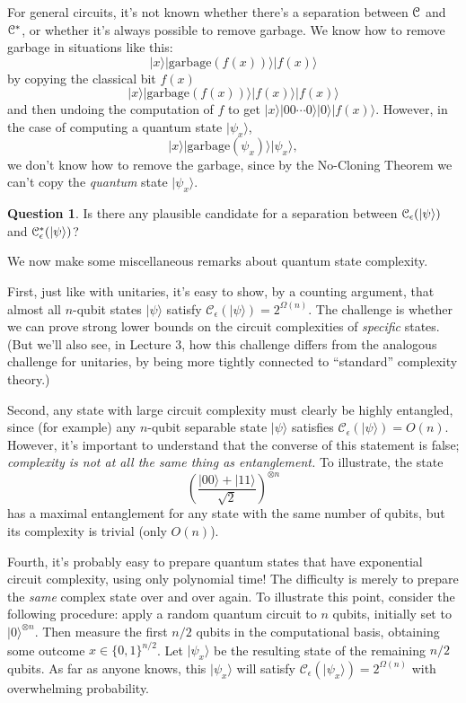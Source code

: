\documentclass[11pt]{report}
\theoremstyle{plain}
\theoremstyle{definition}
\newtheorem{question}[theorem]{Question}
\renewcommand{\ket}[1]{|#1\rangle}
\begin{document}
For general circuits, it's not known whether there's a separation between $\cal C$ and $\cal C^*$, or whether it's always possible to remove garbage.  We know how to remove garbage in situations like this:
\[
 \ket{x}\ket{\mathrm{garbage}(f(x))}\ket{f(x)}
\]
by copying the classical bit $f(x)$
\[
 \ket{x}\ket{\mathrm{garbage}(f(x))}\ket{f(x)}\ket{f(x)}
\]
and then undoing the computation of $f$ to get $\ket{x}\ket{00 \cdots 0}\ket{0}\ket{f(x)}$.
However, in the case of computing a quantum state $\ket{\psi_x}$,
\[
 \ket{x}\ket{\mathrm{garbage}(\psi_x)}\ket{\psi_x},
\]
we don't know how to remove the garbage, since by the No-Cloning Theorem we can't copy the {\em quantum} state $\ket{\psi_x}$.

\begin{question}
Is there any plausible candidate for a separation between $\cal C_{\epsilon}(\ket{\psi})$ and $\cal C^*_{\epsilon}(\ket{\psi})$?
\end{question}

We now make some miscellaneous remarks about quantum state complexity.

First, just like with unitaries, it's easy to show, by a counting argument, that almost all $n$-qubit states $\ket{\psi}$ satisfy $\mathcal{C}_{\epsilon}(\ket{\psi}) = 2^{\Omega(n)}$.  The challenge is whether we can prove strong lower bounds on the circuit complexities of {\em specific} states.  (But we'll also see, in Lecture 3, how this challenge differs from the analogous challenge for unitaries, by being more tightly connected to ``standard'' complexity theory.)

Second, any state with large circuit complexity must clearly be highly entangled, since (for example) any $n$-qubit separable state $\ket{\psi}$ satisfies $\mathcal{C}_{\epsilon}(\ket{\psi}) = O(n)$.  However, it's important to understand that the converse of this statement is false; {\em complexity is not at all the same thing as entanglement.}  To illustrate, the state
\[
\left(\frac{\ket{00}+\ket{11}}{\sqrt 2}\right)^{\otimes n}
\]
has a maximal entanglement for any state with the same number of qubits, but its complexity is trivial (only $O(n)$).

Fourth, it's probably easy to prepare quantum states that have exponential circuit complexity, using only polynomial time!  The difficulty is merely to prepare the {\em same} complex state over and over again.  To illustrate this point, consider the following procedure: apply a random quantum circuit to $n$ qubits, initially set to $\ket{0}^{\otimes n}$. Then measure
the first $n/2$ qubits in the computational basis, obtaining some outcome $x\in \{0,1\}^{n/2}$.  Let $\ket{\psi_x}$ be the resulting state of the remaining $n/2$ qubits.  As far as anyone knows, this $\ket{\psi_x}$ will satisfy $\mathcal{C}_{\epsilon}(\ket{\psi_x}) = 2^{\Omega(n)}$ with overwhelming probability.
\end{document}
